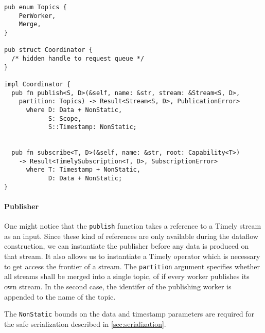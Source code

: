 \begin{lstlisting}[caption={[Publish \& subscribe interface]
The interface for publishing and subscribing Timely streams.
}]
pub enum Topics {
    PerWorker,
    Merge,
}

pub struct Coordinator {
  /* hidden handle to request queue */
}

impl Coordinator {
  pub fn publish<S, D>(&self, name: &str, stream: &Stream<S, D>,
    partition: Topics) -> Result<Stream<S, D>, PublicationError>
      where D: Data + NonStatic, 
            S: Scope,
            S::Timestamp: NonStatic;


  pub fn subscribe<T, D>(&self, name: &str, root: Capability<T>) 
    -> Result<TimelySubscription<T, D>, SubscriptionError>
      where T: Timestamp + NonStatic, 
            D: Data + NonStatic;
}
\end{lstlisting}

\paragraph{Publisher}



One might notice that the \lstinline{publish} function takes a reference to
a Timely stream as an input. Since these kind of references are only available
during the dataflow construction, we can instantiate the publisher before
any data is produced on that stream. It also allows us to instantiate a Timely
operator which is necessary to get access the frontier of a stream. The
\lstinline{partition} argument specifies whether all streams shall be merged
into a single topic, of if every worker publishes its own stream. In the second
case, the identifer of the publishing worker is appended to the name of the topic.

The \lstinline{NonStatic} bounds on the data and timestamp parameters are
required for the safe serialization described in \ref{sec:serialization}.
